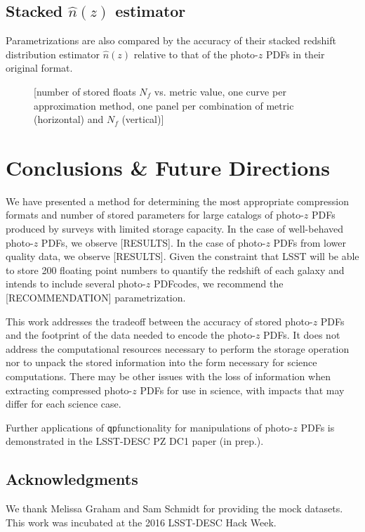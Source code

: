 \documentclass[\docopts]{\docclass}
\newcommand{\qp}{\texttt{qp}}
\newcommand{\pz}{photo-$z$ PDF}
\begin{document}
\subsection{Stacked $\hat{n}(z)$ estimator}
\label{sec:stacked}

Parametrizations are also compared by the accuracy of their stacked redshift 
distribution estimator $\hat{n}(z)$ relative to that of the \pz s in their 
original format.

\begin{figure}
  \caption{[number of stored floats $N_{f}$ vs. metric value, one curve per 
approximation method, one panel per combination of metric (horizontal) and 
$N_{f}$ (vertical)]
  \label{fig:stacked}}
\end{figure}





\section{Conclusions \& Future Directions}
\label{sec:conclusions}

We have presented a method for determining the most appropriate compression 
formats and number of stored parameters for large catalogs of \pz s produced by 
surveys with limited storage capacity.   In the case of well-behaved \pz s, we 
observe [RESULTS].  In the case of \pz s from lower quality data, we observe 
[RESULTS].  Given the constraint that LSST will be able to store 200 floating 
point numbers to quantify the redshift of each galaxy and intends to include 
several \pz  codes, we recommend the [RECOMMENDATION] parametrization.



This work addresses the tradeoff between the accuracy of stored \pz s and the 
footprint of the data needed to encode the \pz s.  It does not address the 
computational resources necessary to perform the storage operation nor to 
unpack the stored information into the form necessary for science computations. 
 There may be other issues with the loss of information when extracting 
compressed \pz s for use in science, with impacts that may differ for each 
science case.

Further applications of \qp functionality for manipulations of \pz s is 
demonstrated in the LSST-DESC PZ DC1 paper (in prep.).

\subsection*{Acknowledgments}


We thank Melissa Graham and Sam Schmidt for providing the mock datasets.  This 
work was incubated at the 2016 LSST-DESC Hack Week.







\end{document}

